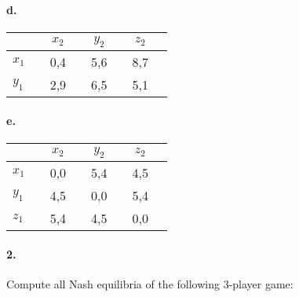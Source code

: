 \documentclass[a4paper,notitlepage,12pt]{article}
\begin{document}
	\paragraph{d. }
	\vspace{-.5cm}
	\begin{center}
		\begin{tabular}[h!]{l|ccccccc}
			&& \Large{$x_2$} && \Large{$y_2$} && \Large{$z_2$} & \\
			\hline
			\Large{$x_1$} && \Large{0,4} && \Large{5,6} && \Large{8,7} & \\
			\Large{$y_1$} && \Large{2,9} && \Large{6,5} && \Large{5,1} & 
		\end{tabular} 
	\end{center}
	\paragraph{e. }
	\vspace{-.5cm}
	\begin{center}
		\begin{tabular}[h!]{l|ccccccc}
			&& \Large{$x_2$} && \Large{$y_2$} && \Large{$z_2$} & \\
			\hline
			\Large{$x_1$} && \Large{0,0} && \Large{5,4} && \Large{4,5} & \\
			\Large{$y_1$} && \Large{4,5} && \Large{0,0} && \Large{5,4} & \\
			\Large{$z_1$} && \Large{5,4} && \Large{4,5} && \Large{0,0} & 
		\end{tabular} 
	\end{center}
	
\paragraph{2. } Compute all Nash equilibria of the following 3-player game:
\end{document}
